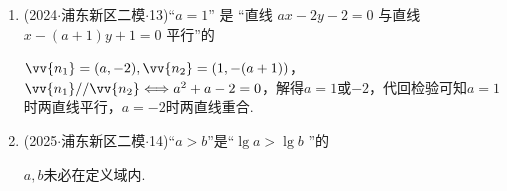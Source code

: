 \begin{enumerate}
    \item (2024$\cdot$浦东新区二模$\cdot$13)“$a = 1$” 是 “直线 $ax - {2y} - 2 = 0$ 与直线 $x - \left( {a + 1}\right) y + 1 = 0$ 平行”的 
    \begin{jieda}
        $\vv{n_1} = (a, -2), \vv{n_2} = (1, -(a+1))$，$\vv{n_1} // \vv{n_2} \Longleftrightarrow a^2+a-2 = 0$，解得$a = 1$或$-2$，代回检验可知$a = 1$时两直线平行，$a = -2$时两直线重合.
    \end{jieda}


    \item (2025$\cdot$浦东新区二模$\cdot$14)“$a>b$”是“$\lg a > \lg b$ ”的 
    \begin{jieda}
        $a, b$未必在定义域内.
    \end{jieda}
\end{enumerate}
